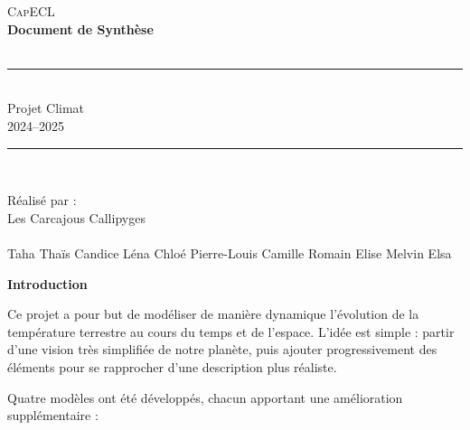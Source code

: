 \documentclass[a4paper,12pt]{article}
\begin{document}
\begin{titlepage}
    \centering

    \vspace*{2cm}
    
    {\LARGE \textsc{CapECL}}\\[1.5cm] %
    
    {\Huge \bfseries Document de Synthèse}\\[0.5cm]
    {\Large \itshape}\\[2cm] %

    \rule{\textwidth}{0.4pt}\\[0.4cm]
    {\large Projet Climat}\\[0.2cm]
    {\large  2024–2025}\\
    \rule{\textwidth}{0.4pt}\\[2cm]
    
    \vfill
    
    {\large Réalisé par :}\\
    {\large  Les Carcajous Callipyges}\\[0.5cm]

    {\large }\\
    {\large Taha Thaïs Candice Léna Chloé Pierre-Louis Camille Romain Elise Melvin Elsa}\\[1cm]

    \vfill

\end{titlepage}

\tableofcontents
\newpage
{}
{\LARGE \textbf{Introduction\\}}


Ce projet a pour but de modéliser de manière dynamique l'évolution de la température terrestre au cours du temps et de l'espace. L'idée est simple : partir d’une vision très simplifiée de notre planète, puis ajouter progressivement des éléments pour se rapprocher d’une description plus réaliste.

Quatre modèles ont été développés, chacun apportant une amélioration supplémentaire : 
\end{document}
